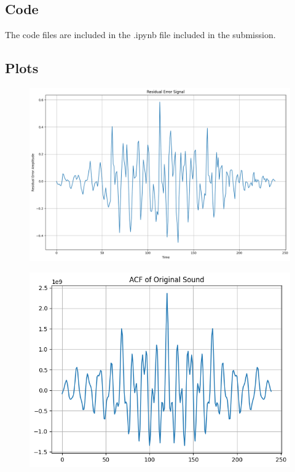 \documentclass{article}
\begin{document}
\subsection{Code}
The code files are included in the .ipynb file included in the submission.

\subsection{Plots}

\begin{figure}[H]
\begin{center}
\includegraphics[scale = 0.5]{res.png}
\end{center}
\end{figure}

\begin{figure}[H]
\begin{center}
\includegraphics[scale = 0.8]{acf_act.png}
\end{center}
\end{figure}
\end{document}
